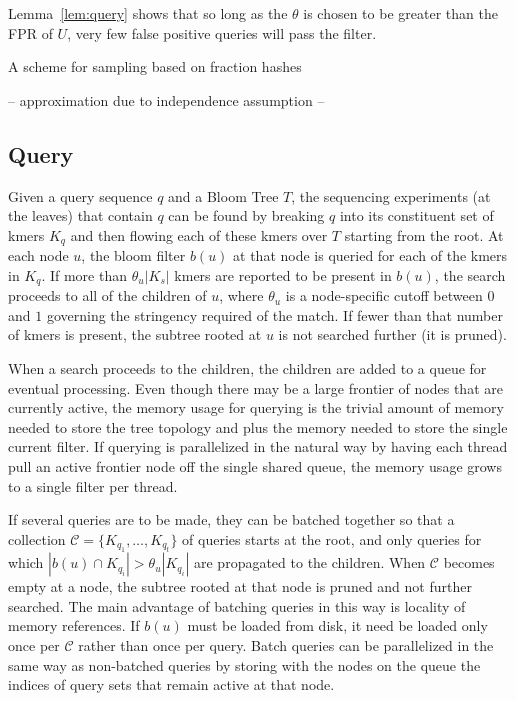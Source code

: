 \documentclass[11pt]{article}
\begin{document}
Lemma~\ref{lem:query} shows that so long as the $\theta$ is chosen to be greater than the FPR of $U$, very few false positive queries will pass the filter.


A scheme for sampling based on fraction hashes

-- approximation due to independence assumption
-- 

\subsection{Query}

Given a query sequence $q$ and a Bloom Tree $T$, the sequencing experiments (at the leaves) that contain $q$ can be found by breaking $q$ into its constituent set of kmers $K_q$ and then flowing each of these kmers over $T$ starting from the root. At each node $u$, the bloom filter $b(u)$ at that node is queried for each of the kmers in $K_q$. If more than $\theta_u|K_s|$ kmers are reported to be present in $b(u)$, the search proceeds to all of the children of $u$, where $\theta_u$ is a node-specific cutoff between $0$ and $1$ governing the stringency required of the match. If fewer than that number of kmers is present, the subtree rooted at $u$ is not searched further (it is pruned). 

When a search proceeds to the children, the children are added to a queue for eventual processing.  Even though there may be a large frontier of nodes that are currently active, the memory usage for querying is the trivial amount of memory needed to store the tree topology and plus the memory needed to store the single current filter. If querying is parallelized in the natural way by having each thread pull an active frontier node off the single shared queue, the memory usage grows to a single filter per thread.

If several queries are to be made, they can be batched together so that a collection $\mathcal{C} = \{K_{q_1},\dots,K_{q_t}\}$ of queries starts at the root, and only queries for which $|b(u) \cap K_{q_i}| > \theta_u |K_{q_i}|$ are propagated to the children. When $\mathcal{C}$ becomes empty at a node, the subtree rooted at that node is pruned and not further searched.
The main advantage of batching queries in this way is locality of memory references. If $b(u)$ must be loaded from disk, it need be loaded only once per $\mathcal{C}$ rather than once per query. Batch queries can be parallelized in the same way as non-batched queries by storing with the nodes on the queue the indices of query sets that remain active at that node.
\end{document}
